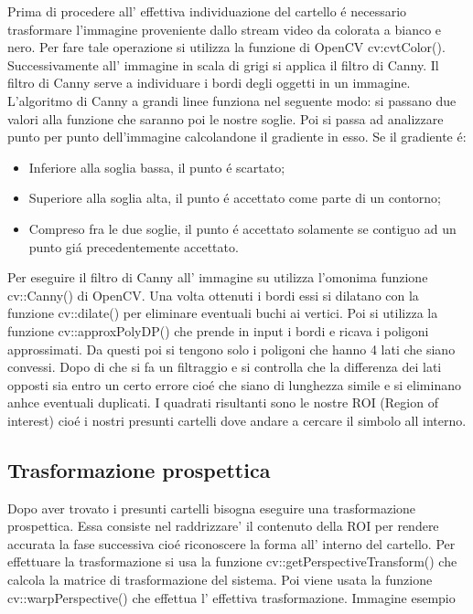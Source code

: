 	Prima di procedere all' effettiva individuazione del cartello \'e necessario trasformare l'immagine proveniente dallo stream video da colorata a bianco e nero. Per fare tale operazione si utilizza la funzione di OpenCV cv:cvtColor(). Successivamente all' immagine  in scala di grigi si applica il filtro di Canny. Il filtro di Canny serve a individuare i bordi degli oggetti in un immagine. L'algoritmo di Canny a grandi linee funziona nel seguente modo: si passano due valori alla funzione che saranno poi le nostre soglie. Poi si passa ad analizzare punto per punto dell'immagine calcolandone il gradiente in esso.  Se il gradiente \'e:
	\begin{itemize}
		\item Inferiore alla soglia bassa, il punto \'e scartato;
		\item Superiore alla soglia alta, il punto \'e accettato come parte di un contorno;
		\item Compreso fra le due soglie, il punto \'e accettato solamente se contiguo ad un punto gi\'a precedentemente accettato.
	\end{itemize}
	Per eseguire il filtro di Canny all' immagine su utilizza l'omonima funzione cv::Canny() di OpenCV.
	Una volta ottenuti i bordi essi si dilatano con la funzione cv::dilate() per eliminare eventuali buchi ai vertici.
	Poi si utilizza la funzione cv::approxPolyDP() che prende in input i bordi e ricava i poligoni approssimati.
	Da questi poi si tengono solo i poligoni che hanno 4 lati che siano convessi.
	Dopo di che si fa un  filtraggio e si controlla che la differenza dei lati opposti sia entro un certo errore cio\'e che siano di lunghezza simile e si eliminano anhce eventuali duplicati.
	I quadrati risultanti sono le nostre ROI (Region of interest) cio\'e i nostri presunti cartelli dove andare a cercare il simbolo all interno.

\subsection{Trasformazione prospettica}

	Dopo aver trovato i presunti cartelli bisogna eseguire una trasformazione prospettica. Essa consiste nel raddrizzare' il contenuto della ROI per rendere accurata la fase successiva cio\'e riconoscere la forma all' interno del cartello.
	Per effettuare la trasformazione si usa la funzione cv::getPerspectiveTransform() che calcola la matrice di trasformazione del sistema. Poi viene usata la funzione cv::warpPerspective() che effettua l' effettiva trasformazione.
	Immagine esempio

